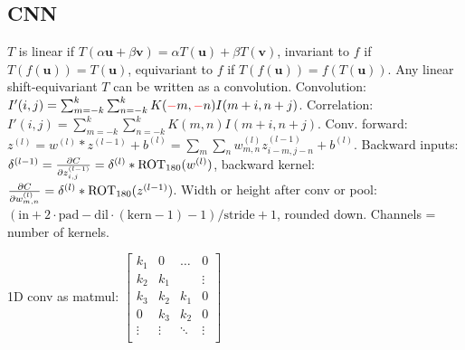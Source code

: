 \documentclass[11pt,landscape,a4paper,fleqn]{article}
\def\myvector#1{\mathbf{#1}}
\def\vu{{\myvector{u}}}
\def\vv{{\myvector{v}}}
\begin{document}
\begin{multicols*}{4}
\section{CNN} $T$ is linear if $T(\alpha \vu + \beta \vv) = \alpha T(\vu) + \beta T(\vv)$,
invariant to $f$ if $T(f(\vu)) = T(\vu)$,
equivariant to $f$ if $T(f(\vu)) = f(T(\vu))$.
Any linear shift-equivariant $T$ can be written as a convolution.
Convolution:
$I'(i, j) = \sum_{m =- k}^k \sum_{n =- k}^k K(\textcolor{red}{-}m, \textcolor{red}{-}n)I(m + i, n + j)$.
Correlation:
$I'(i, j) = \sum_{m =- k}^k \sum_{n =- k}^k K(m, n)I(m + i, n + j)$.
Conv. forward: $z^{(l)} = w^{(l)} * z^{(l - 1)} + b^{(l)} = \sum_m \sum_n w_{m, n}^{(l)} z_{i - m, j - n}^{(l - 1)} + b^{(l)}$.
Backward inputs: $\delta^{(l - 1)} = \pdv{C}{z_{i,j}^{(l - 1)}} = \delta^{(l)} * \mathrm{ROT}_{180}(w^{(l)})$,
backward kernel: $\pdv{C}{w_{m, n}^{(l)}} = \delta^{(l)} * \mathrm{ROT}_{180}(z^{(l - 1)})$.
Width or height after conv or pool: $(\mathrm{in} + 2 \cdot \mathrm{pad} - \mathrm{dil} \cdot (\mathrm{kern} - 1) - 1) / \mathrm{stride} + 1$,
rounded down.
Channels = number of kernels.

1D conv as matmul:
\(\begin{bmatrix}
    k_1 & 0 & \dots & 0 \\
    k_2 & k_1 &  & \vdots \\
    k_3 & k_2 & k_1 & 0 \\
    0 & k_3 & k_2 & 0 \\
    \vdots & \vdots & \ddots & \vdots \\
\end{bmatrix}\)


\end{multicols*}
\end{document}
